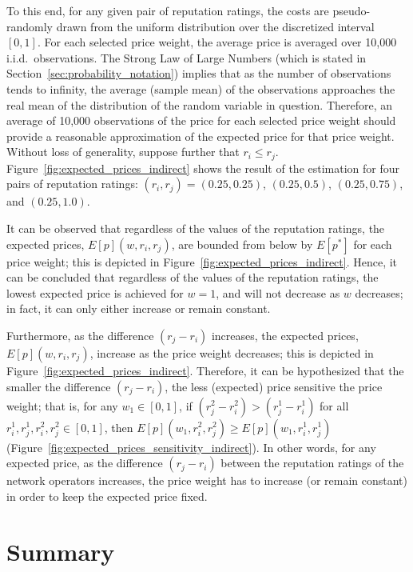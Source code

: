 To this end, for any given pair of reputation ratings, the costs are pseudo-randomly drawn from the uniform distribution over the discretized interval $[0,1]$. For each selected price weight, the average price is averaged over 10,000 i.i.d.~observations. The Strong Law of Large Numbers (which is stated in Section~\ref{sec:probability_notation}) implies that as the number of observations tends to infinity, the average (sample mean) of the observations approaches the real mean of the distribution of the random variable in question. Therefore, an average of 10,000 observations of the price for each selected price weight should provide a reasonable approximation of the expected price for that price weight. Without loss of generality, suppose further that $r_i \le r_j$. Figure~\ref{fig:expected_prices_indirect} shows the result of the estimation for four pairs of reputation ratings: $(r_i, r_j) = (0.25, 0.25)$, $(0.25, 0.5)$, $(0.25, 0.75)$, and $(0.25, 1.0)$.

It can be observed that regardless of the values of the reputation ratings, the expected prices, $E[p](w,r_i,r_j)$, are bounded from below by $E[p^*]$ for each price weight; this is depicted in Figure~\ref{fig:expected_prices_indirect}. Hence, it can be concluded that regardless of the values of the reputation ratings, the lowest expected price is achieved for $w=1$, and will not decrease as $w$ decreases; in fact, it can only either increase or remain constant.

Furthermore, as the difference $(r_j-r_i)$ increases, the expected prices, $E[p](w,r_i,r_j)$, increase as the price weight decreases; this is depicted in Figure~\ref{fig:expected_prices_indirect}. Therefore, it can be hypothesized that the smaller the difference $(r_j-r_i)$, the less (expected) price sensitive the price weight; that is, for any $w_1\in[0,1]$, if $(r^2_j-r^2_i) > (r^1_j-r^1_i)$ for all $r^1_i,r^1_j,r^2_i,r^2_j\in [0,1]$, then $E[p](w_1,r^2_i,r^2_j) \ge E[p](w_1,r^1_i,r^1_j)$ (Figure~\ref{fig:expected_prices_sensitivity_indirect}). In other words, for any expected price, as the difference $(r_j-r_i)$ between the reputation ratings of the network operators increases, the price weight has to increase (or remain constant) in order to keep the expected price fixed.

\section{Summary}
\label{sec:summary_indirect}

